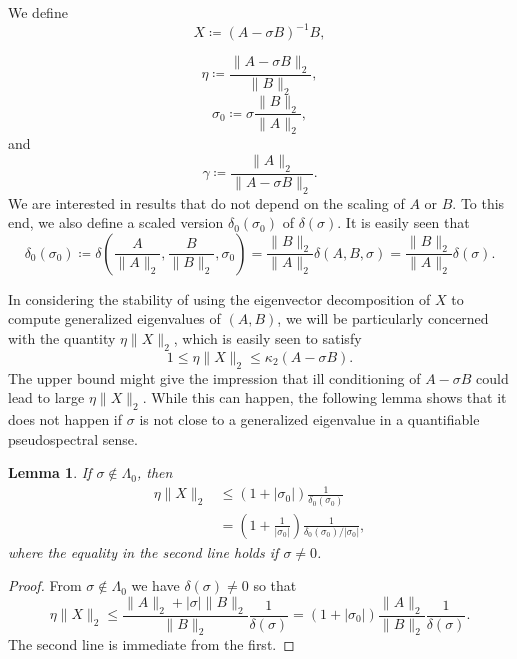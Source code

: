 \documentclass[12pt]{article}
\newtheorem{lemma}{Lemma}
\begin{document}
We define
\begin{equation}
  \label{eq:Xdef}
  X \coloneqq (A-\sigma B)^{-1} B,
\end{equation}

\begin{equation}
  \label{eq:eta_def}
  \eta \coloneqq \frac{\|A-\sigma B\|_2}{\|B\|_2},
\end{equation}
\begin{equation}
  \label{eq:sigma0_def}
  \sigma_0 \coloneqq \sigma \frac{\|B\|_2}{\|A\|_2},
\end{equation}
and
\begin{equation}
  \label{eq:gamma_def}
  \gamma \coloneqq \frac{\|A\|_2}{\|A-\sigma B\|_2}.
\end{equation}
We are interested in results that do not depend on the scaling of $A$
or $B$.  To this end, we also define a scaled version
$\delta_0(\sigma_0)$ of $\delta(\sigma)$.  It is easily seen that
\begin{equation*}
  \delta_0(\sigma_0) \coloneqq \delta\left(\frac{A}{\|A\|_2}, \frac{B}{\|B\|_2}, \sigma_0 \right) =
  \frac{\|B\|_2}{\|A\|_2} \delta(A, B, \sigma)=\frac{\|B\|_2}{\|A\|_2} \delta(\sigma).
\end{equation*}

In considering the stability of using the eigenvector decomposition of $X$
to compute generalized eigenvalues of $(A,B)$, we will be particularly concerned with
the quantity $\eta \|X\|_2$, which is easily seen to satisfy
\begin{equation*}
  1 \leq \eta \|X\|_2 \leq \kappa_2(A-\sigma B).
\end{equation*}
The upper bound might give the impression that ill conditioning of
$A-\sigma B$ could lead to large $\eta \|X\|_2$.  While this can
happen, the following lemma shows that it does not happen if
$\sigma$ is not close to a generalized eigenvalue in a quantifiable pseudospectral
sense.
\begin{lemma}
  \label{lm:eta_X_bound}
  If $\sigma \notin \Lambda_0$, then
  \begin{align*}
    \eta \|X\|_2     
    & \leq (1+|\sigma_0|) \frac{1}{\delta_0(\sigma_0)} \\
    & = \left(1 + \frac{1}{|\sigma_0|}\right)
      \frac{1}{\delta_0(\sigma_0)/|\sigma_0|},
  \end{align*}
  where the equality in the second line holds if $\sigma \neq 0$.
\end{lemma}
\begin{proof}
  From $\sigma \notin \Lambda_0$ we have $\delta(\sigma)\neq 0$ so that
  \begin{equation*}
    \eta \|X\|_2
    \leq \frac{\|A\|_2 + |\sigma| \|B\|_2}{\|B\|_2} \frac{1}{\delta(\sigma)}
    = (1 + |\sigma_0|) \frac{\|A\|_2}{\|B\|_2} \frac{1}{\delta(\sigma)}.
  \end{equation*}
  The second line is immediate from the first.
\end{proof}
\end{document}
